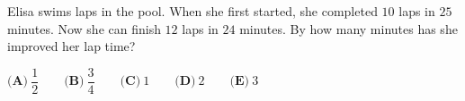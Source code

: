 Elisa swims laps in the pool. When she first started, she completed $10$ laps in $25$ minutes. Now she can finish $12$ laps in $24$ minutes. By how many minutes has she improved her lap time?

$\textbf{(A)}\ \dfrac{1}{2} \qquad \textbf{(B)}\ \dfrac{3}{4} \qquad \textbf{(C)}\ 1 \qquad \textbf{(D)}\ 2 \qquad \textbf{(E)}\ 3$

